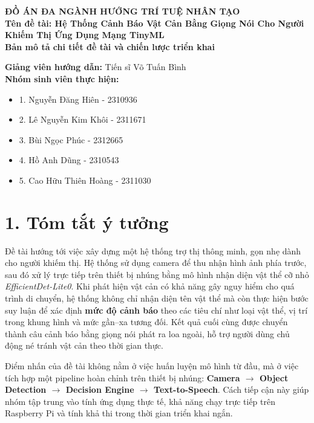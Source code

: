 \documentclass[11pt, a4paper]{article}
\begin{document}
\begin{center}
    {\Large\textbf{ĐỒ ÁN ĐA NGÀNH HƯỚNG TRÍ TUỆ NHÂN TẠO}}\\[0.25cm]
    {\large\textbf{Tên đề tài: Hệ Thống Cảnh Báo Vật Cản Bằng Giọng Nói Cho Người Khiếm Thị Ứng Dụng Mạng TinyML}}\\[0.35cm]
    {\normalsize\textbf{Bản mô tả chi tiết đề tài và chiến lược triển khai}}
\end{center}

\textbf{Giảng viên hướng dẫn:} Tiến sĩ Võ Tuấn Bình \\
\textbf{Nhóm sinh viên thực hiện:}
\begin{itemize}[itemsep=0pt, parsep=0pt, topsep=2pt]
    \item 1. Nguyễn Đăng Hiên - 2310936
    \item 2. Lê Nguyễn Kim Khôi - 2311671
    \item 3. Bùi Ngọc Phúc - 2312665
    \item 4. Hồ Anh Dũng - 2310543
    \item 5. Cao Hữu Thiên Hoàng - 2311030
\end{itemize}

\section*{1. Tóm tắt ý tưởng}
Đề tài hướng tới việc xây dựng một hệ thống trợ thị thông minh, gọn nhẹ dành cho người khiếm thị. Hệ thống sử dụng camera để thu nhận hình ảnh phía trước, sau đó xử lý trực tiếp trên thiết bị nhúng bằng mô hình nhận diện vật thể cỡ nhỏ \textit{EfficientDet-Lite0}. Khi phát hiện vật cản có khả năng gây nguy hiểm cho quá trình di chuyển, hệ thống không chỉ nhận diện tên vật thể mà còn thực hiện bước suy luận để xác định \textbf{mức độ cảnh báo} theo các tiêu chí như loại vật thể, vị trí trong khung hình và mức gần--xa tương đối. Kết quả cuối cùng được chuyển thành câu cảnh báo bằng giọng nói phát ra loa ngoài, hỗ trợ người dùng chủ động né tránh vật cản theo thời gian thực.

Điểm nhấn của đề tài không nằm ở việc huấn luyện mô hình từ đầu, mà ở việc tích hợp một pipeline hoàn chỉnh trên thiết bị nhúng: \textbf{Camera $\rightarrow$ Object Detection $\rightarrow$ Decision Engine $\rightarrow$ Text-to-Speech}. Cách tiếp cận này giúp nhóm tập trung vào tính ứng dụng thực tế, khả năng chạy trực tiếp trên Raspberry Pi và tính khả thi trong thời gian triển khai ngắn.
\end{document}
